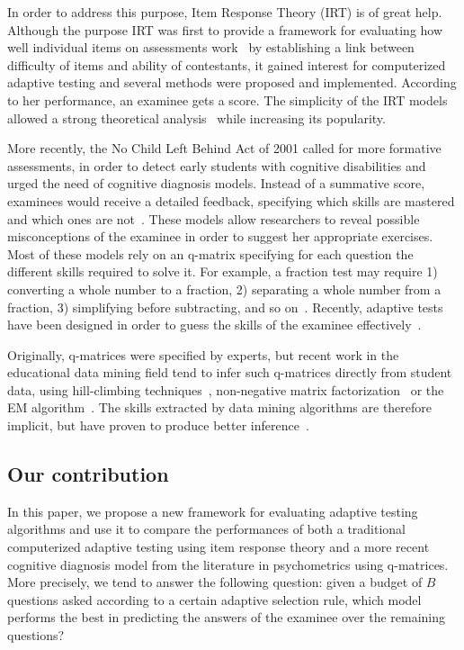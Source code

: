 \documentclass{sig-alternate}
\begin{document}
In order to address this purpose, Item Response Theory (IRT) is of great help. Although the purpose IRT was first to provide a framework for evaluating how well individual items on assessments work~\cite{Hambleton1991} by establishing a link between difficulty of items and ability of contestants, it gained interest for computerized adaptive testing and several methods were proposed and implemented. According to her performance, an examinee gets a score. The simplicity of the IRT models allowed a strong theoretical analysis~\cite{Baker2004} while increasing its popularity.

More recently, the No Child Left Behind Act of 2001 called for more formative assessments, in order to detect early students with cognitive disabilities and urged the need of cognitive diagnosis models. Instead of a summative score, examinees would receive a detailed feedback, specifying which skills are mastered and which ones are not~\cite{Cheng2009}. These models allow researchers to reveal possible misconceptions of the examinee in order to suggest her appropriate exercises. Most of these models rely on an q-matrix specifying for each question the different skills required to solve it. For example, a fraction test may require 1) converting a whole number to a fraction, 2) separating a whole number from a fraction, 3) simplifying before subtracting, and so on~\cite{DeLaTorreDouglas2004}. Recently, adaptive tests have been designed in order to guess the skills of the examinee effectively~\cite{Huebner2010}.

Originally, q-matrices were specified by experts, but recent work in the educational data mining field tend to infer such q-matrices directly from student data, using hill-climbing techniques~\cite{Barnes2005}, non-negative matrix factorization~\cite{Desmarais2011} or the EM algorithm~\cite{Huebner2010}. The skills extracted by data mining algorithms are therefore implicit, but have proven to produce better inference~\cite{Barnes2003}.

\subsection{Our contribution}

In this paper, we propose a new framework for evaluating adaptive testing algorithms and use it to compare the performances of both a traditional computerized adaptive testing using item response theory and a more recent cognitive diagnosis model from the literature in psychometrics using q-matrices. More precisely, we tend to answer the following question: given a budget of $B$ questions asked according to a certain adaptive selection rule, which model performs the best in predicting the answers of the examinee over the remaining questions?
\end{document}
